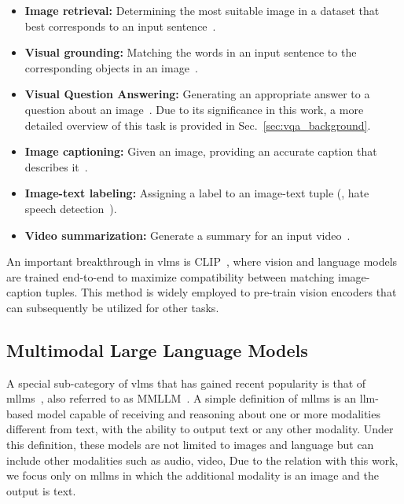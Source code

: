 \begin{itemize}
    \item \textbf{Image retrieval:} Determining the most suitable image in a dataset that best corresponds to an input sentence~\cite{lee2018stacked}.

    \item \textbf{Visual grounding:} Matching the words in an input sentence to the corresponding objects in an image~\cite{kazemzadeh2014referitgame}.

    \item \textbf{Visual Question Answering:} Generating an appropriate answer to a question about an image~\cite{antol2015vqa}. Due to its significance in this work, a more detailed overview of this task is provided in Sec.~\ref{sec:vqa_background}.

    \item \textbf{Image captioning:} Given an image, providing an accurate caption that describes it~\cite{karpathy2015deep}.

    \item \textbf{Image-text labeling:} Assigning a label to an image-text tuple (\eg, hate speech detection~\cite{hebert2024multimodal}).

    \item \textbf{Video summarization:} Generate a summary for an input video~\cite{Li_2023_WACV}.
\end{itemize}

An important breakthrough in \glspl{vlm} is CLIP~\cite{radford2021learning}, where vision and language models are trained end-to-end to maximize compatibility between matching image-caption tuples. This method is widely employed to pre-train vision encoders that can subsequently be utilized for other tasks.


\subsection{Multimodal Large Language Models}
\label{subsec:mllms}
A special sub-category of \glspl{vlm} that has gained recent popularity is that of \glspl{mllm}~\cite{dai2023instructblip,liu2023visual,openai2023gpt4v,geminiteam2023gemini}, also referred to as MMLLM~\cite{zhang2024mmllms}. A simple definition of \glspl{mllm} is an \gls{llm}-based model capable of receiving and reasoning about one or more modalities different from text, with the ability to output text or any other modality. Under this definition, these models are not limited to images and language but can include other modalities such as audio, video, \etc  Due to the relation with this work, we focus only on \glspl{mllm} in which the additional modality is an image and the output is text. 

